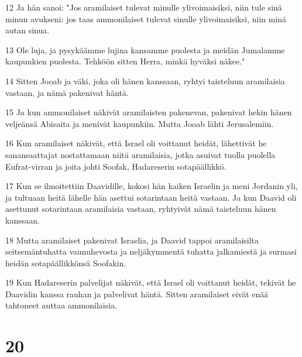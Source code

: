 \par 12 Ja hän sanoi: "Jos aramilaiset tulevat minulle ylivoimaisiksi, niin tule sinä minun avukseni: jos taas ammonilaiset tulevat sinulle ylivoimaisiksi, niin minä autan sinua.
\par 13 Ole luja, ja pysykäämme lujina kansamme puolesta ja meidän Jumalamme kaupunkien puolesta. Tehköön sitten Herra, minkä hyväksi näkee."
\par 14 Sitten Jooab ja väki, joka oli hänen kanssaan, ryhtyi taisteluun aramilaisia vastaan, ja nämä pakenivat häntä.
\par 15 Ja kun ammonilaiset näkivät aramilaisten pakenevan, pakenivat hekin hänen veljeänsä Abisaita ja menivät kaupunkiin. Mutta Jooab lähti Jerusalemiin.
\par 16 Kun aramilaiset näkivät, että Israel oli voittanut heidät, lähettivät he sanansaattajat nostattamaan niitä aramilaisia, jotka asuivat tuolla puolella Eufrat-virran ja joita johti Soofak, Hadareserin sotapäällikkö.
\par 17 Kun se ilmoitettiin Daavidille, kokosi hän kaiken Israelin ja meni Jordanin yli, ja tultuaan heitä lähelle hän asettui sotarintaan heitä vastaan. Ja kun Daavid oli asettunut sotarintaan aramilaisia vastaan, ryhtyivät nämä taisteluun hänen kanssaan.
\par 18 Mutta aramilaiset pakenivat Israelia, ja Daavid tappoi aramilaisilta seitsemäntuhatta vaunuhevosta ja neljäkymmentä tuhatta jalkamiestä ja surmasi heidän sotapäällikkönsä Soofakin.
\par 19 Kun Hadareserin palvelijat näkivät, että Israel oli voittanut heidät, tekivät he Daavidin kanssa rauhan ja palvelivat häntä. Sitten aramilaiset eivät enää tahtoneet auttaa ammonilaisia.

\chapter{20}

